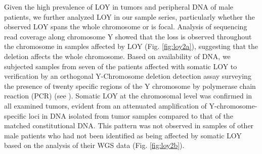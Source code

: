 Given the high prevalence of LOY in tumors and peripheral DNA of male patients, we further analyzed LOY in our sample series, particularly whether the observed LOY spans the whole chromosome or is focal.
Analysis of sequencing read coverage along chromosome Y showed that the loss is observed throughout the chromosome in samples affected by LOY (Fig. \ref{fig:loy2a}), suggesting that the deletion affects the whole chromosome.
Based on availability of DNA, we subjected samples from seven of the patients affected with somatic LOY to verification by an orthogonal Y-Chromosome deletion detection assay surveying the presence of twenty specific regions of the Y chromosome by polymerase chain reaction (PCR) (see ).
Somatic LOY at the chromosomal level was confirmed in all examined tumors, evident from an attenuated amplification of Y-chromosome-specific loci in DNA isolated from tumor samples compared to that of the matched constitutional DNA.
This pattern was not observed in samples of other male patients who had not been identified as being affected by somatic LOY based on the analysis of their WGS data (Fig. \ref{fig:loy2b}).

